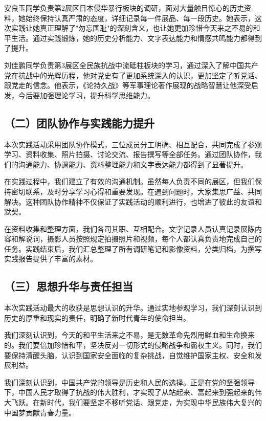 \documentclass[a4paper,12pt]{article}
\begin{document}
安良玉同学负责第2展区日本侵华暴行板块的调研，面对大量触目惊心的历史资料，她始终保持认真严肃的态度，详细记录每一件展品、每一段历史。她表示，这次实践让她真正理解了"勿忘国耻"的深刻含义，也让她更加珍惜今天来之不易的和平生活。通过实践锻炼，她的历史分析能力、文字表达能力和情感共鸣能力都得到了提升。

刘佳鹏同学负责第3展区全民族抗战中流砥柱板块的学习，通过深入了解中国共产党在抗战中的光辉历程，他对党史有了更加系统深入的认识，更加坚定了听党话、跟党走的信念。他表示，《论持久战》等军事理论著作展现的战略智慧让他深受启发，今后要加强理论学习，提升科学思维能力。

\subsection*{\songti{}\textbf{（二）团队协作与实践能力提升}}

本次实践活动采用团队协作模式，三位成员分工明确、相互配合，共同完成了参观学习、资料收集、照片拍摄、讨论交流、报告撰写等全部任务。通过团队协作，我们的沟通能力、协调能力、资料整理能力和文字表达能力都得到了显著提升。

在实践过程中，我们建立了有效的沟通机制。虽然每人负责不同的展区，但我们保持密切联系，及时分享学习心得和重要发现。在遇到问题时，大家集思广益、共同解决。这种团队协作精神不仅保证了实践活动的顺利进行，也增进了彼此的友谊和默契。

在资料收集和整理方面，我们各司其职、互相配合。文字记录人员认真记录展陈内容和解说词，摄影人员按照规定拍摄照片和视频，每个人都认真负责地完成自己的任务。实践结束后，我们汇总整理了所有调研笔记和影像资料，分类归档，为撰写实践报告提供了丰富的素材。

\subsection*{\songti{}\textbf{（三）思想升华与责任担当}}

本次实践活动最大的收获是思想认识的升华。通过实地参观学习，我们深刻认识到历史的厚重和现实的责任，明确了新时代青年的使命担当。

我们深刻认识到，今天的和平生活来之不易，是无数革命先烈用鲜血和生命换来的。我们要倍加珍惜和平，坚决反对一切形式的侵略战争和霸权主义。同时，我们要保持清醒头脑，认识到国家安全面临的复杂挑战，自觉维护国家主权、安全和发展利益。

我们深刻认识到，中国共产党的领导是历史和人民的选择。正是在党的坚强领导下，中国人民才取得了抗战的伟大胜利，才实现了从站起来、富起来到强起来的伟大飞跃。在新时代，我们要坚定不移听党话、跟党走，为实现中华民族伟大复兴的中国梦贡献青春力量。
\end{document}

